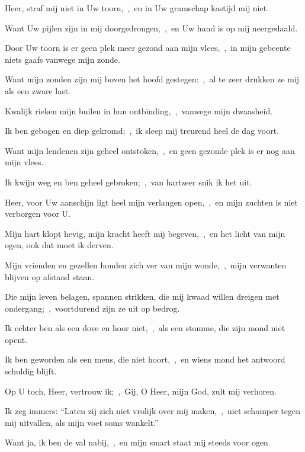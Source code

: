 \documentclass[12pt,twoside,a5paper]{article}
\begin{document}

\begin{halfparskip}
   Heer, straf mij niet in Uw toorn,~\sep\ en in Uw gramschap kastijd mij niet.


  Want Uw pijlen zijn in mij doorgedrongen,~\sep\ en Uw hand is op mij neergedaald.

  Door Uw toorn is er geen plek meer gezond aan mijn vlees,~\sep\ in mijn gebeente niets gaafs vanwege mijn zonde.

  Want mijn zonden zijn mij boven het hoofd gestegen:~\sep\ al te zeer drukken ze mij als een zware last.

  Kwalijk rieken mijn builen in hun ontbinding,~\sep\ vanwege mijn dwaasheid.

  Ik ben gebogen en diep gekromd;~\sep\ ik sleep mij treurend heel de dag voort.

  Want mijn lendenen zijn geheel ontstoken,~\sep\ en geen gezonde plek is er nog aan mijn vlees.

  Ik kwijn weg en ben geheel gebroken;~\sep\ van hartzeer snik ik het uit.

  Heer, voor Uw aanschijn ligt heel mijn verlangen open,~\sep\ en mijn zuchten is niet verborgen voor U.

  Mijn hart klopt hevig, mijn kracht heeft mij begeven,~\sep\ en het licht van mijn ogen, ook dat moet ik derven.

  Mijn vrienden en gezellen houden zich ver van mijn wonde,~\sep\ mijn verwanten blijven op afstand staan.

  Die mijn leven belagen, spannen strikken, die mij kwaad willen dreigen met ondergang;~\sep\ voortdurend zijn ze uit op bedrog.

  Ik echter ben als een dove en hoor niet,~\sep\ als een stomme, die zijn mond niet opent.

  Ik ben geworden als een mens, die niet hoort,~\sep\ en wiens mond het antwoord schuldig blijft.

  Op U toch, Heer, vertrouw ik;~\sep\ Gij, O Heer, mijn God, zult mij verhoren.

  Ik zeg immers: ``Laten zij zich niet vrolijk over mij maken,~\sep\ niet schamper tegen mij uitvallen, als mijn voet soms wankelt.''

  Want ja, ik ben de val nabij,~\sep\ en mijn smart staat mij steeds voor ogen.


\end{halfparskip}
\end{document}
